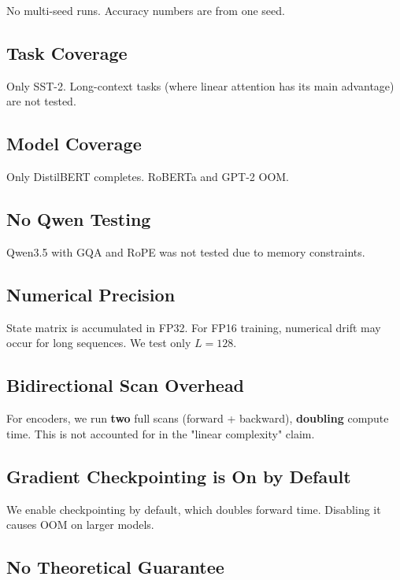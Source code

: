 No multi-seed runs. Accuracy numbers are from one seed.

\subsection{Task Coverage}

Only SST-2. Long-context tasks (where linear attention has its main 
advantage) are not tested.

\subsection{Model Coverage}

Only DistilBERT completes. RoBERTa and GPT-2 OOM.

\subsection{No Qwen Testing}

Qwen3.5 with GQA and RoPE was not tested due to memory constraints.

\subsection{Numerical Precision}

State matrix is accumulated in FP32. For FP16 training, numerical drift 
may occur for long sequences. We test only $L = 128$.

\subsection{Bidirectional Scan Overhead}

For encoders, we run \textbf{two} full scans (forward + backward), \textbf{doubling} 
compute time. This is not accounted for in the "linear complexity" claim.

\subsection{Gradient Checkpointing is On by Default}

We enable checkpointing by default, which doubles forward time. Disabling 
it causes OOM on larger models.

\subsection{No Theoretical Guarantee}

